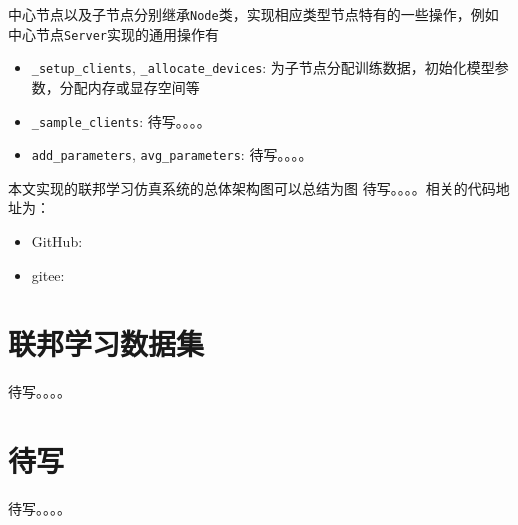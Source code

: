 中心节点以及子节点分别继承\texttt{Node}类，实现相应类型节点特有的一些操作，例如中心节点\texttt{Server}实现的通用操作有
\begin{itemize}
    \item \texttt{\_setup\_clients}, \texttt{\_allocate\_devices}: 为子节点分配训练数据，初始化模型参数，分配内存或显存空间等
    \item \texttt{\_sample\_clients}: 待写。。。。
    \item \texttt{add\_parameters}, \texttt{avg\_parameters}: 待写。。。。
\end{itemize}

本文实现的联邦学习仿真系统的总体架构图可以总结为图 待写。。。。相关的代码地址为：
\begin{itemize}
    \item GitHub: \urlgithub
    \item gitee: \urlgitee
\end{itemize}

\section{联邦学习数据集}
\label{sec:chap5-datasets}


待写。。。。

\section{待写}


待写。。。。
